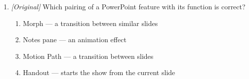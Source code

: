 \begin{enumerate}[label=\textbf{Q\arabic*.}, leftmargin=*]
\begin{enumerate}[label=\Alph*.]
    \item Esc --- end the slide show
    \item Alt+F5 --- end the slide show
  \end{enumerate}
\item \textit{[Original]} Which pairing of a PowerPoint feature with its function
  is correct?
  \begin{enumerate}[label=\Alph*.]
    \item Morph --- a transition between similar slides
    \item Notes pane --- an animation effect
    \item Motion Path --- a transition between slides
    \item Handout --- starts the show from the current slide
  \end{enumerate}


\end{enumerate}
